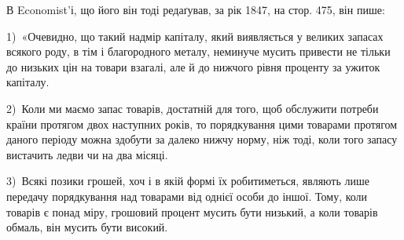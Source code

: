 В Economist’і, що його він тоді редаґував, за рік 1847, на стор. 475,
він пише:

1)~«Очевидно, що такий надмір капіталу, який виявляється у великих запасах
всякого роду, в тім і благородного металу, неминуче мусить привести не тільки
до низьких цін на товари взагалі, але й до нижчого рівня проценту за ужиток
капіталу.

2)~Коли ми маємо запас товарів, достатній для того, щоб обслужити
потреби країни протягом двох наступних років, то порядкування цими
товарами протягом даного періоду можна здобути за далеко нижчу норму, ніж
тоді, коли того запасу вистачить ледви чи на два місяці.

3)~Всякі позики грошей,
хоч і в якій формі їх робитиметься, являють лише передачу порядкування над
товарами від однієї особи до іншої. Тому, коли товарів є понад міру, грошовий
процент мусить бути низький, а коли товарів обмаль, він мусить бути високий.
